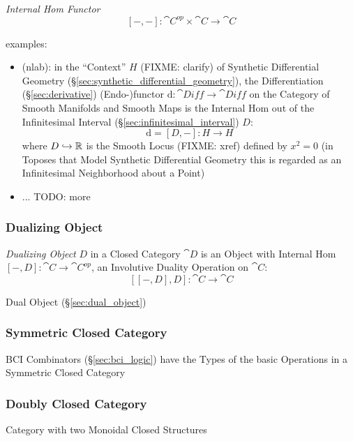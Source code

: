 \emph{Internal Hom Functor}
\[
  [-,-] : \cat{C}^{op} \times \cat{C} \rightarrow \cat{C}
\]

examples:
\begin{itemize}
  \item (nlab): in the ``Context'' $H$ (FIXME: clarify) of Synthetic
    Differential Geometry (\S\ref{sec:synthetic_differential_geometry}), the
    Differentiation (\S\ref{sec:derivative}) (Endo-)functor $\mathrm{d} :
    \cat{Diff} \rightarrow \cat{Diff}$ on the Category of Smooth Manifolds and
    Smooth Maps is the Internal Hom out of the Infinitesimal Interval
    (\S\ref{sec:infinitesimal_interval}) $D$:
    \[
      \mathrm{d} = [D,-] : H \rightarrow H
    \]
    where $D \hookrightarrow \mathbb{R}$ is the Smooth Locus (FIXME: xref) defined
    by $x^2 = 0$ (in Toposes that Model Synthetic Differential Geometry this is
    regarded as an Infinitesimal Neighborhood about a Point)
  \item ... TODO: more
\end{itemize}



\subsubsection{Dualizing Object}\label{sec:dualizing_object}

\emph{Dualizing Object} $D$ in a Closed Category $\cat{D}$ is an
Object with Internal Hom $[-,D]: \cat{C} \rightarrow \cat{C}^{op}$, an
Involutive Duality Operation on $\cat{C}$: %
\[
  [[-,D],D]: \cat{C} \rightarrow \cat{C}
\]

Dual Object (\S\ref{sec:dual_object})



\subsubsection{Symmetric Closed Category}
\label{sec:symmetric_closed_category}

BCI Combinators (\S\ref{sec:bci_logic}) have the Types of the basic
Operations in a Symmetric Closed Category



\subsubsection{Doubly Closed Category}\label{sec:doubly_closed_category}

Category with two Monoidal Closed Structures

